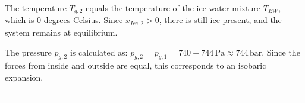 The temperature \( T_{g,2} \) equals the temperature of the ice-water mixture \( T_{EW} \), which is 0 degrees Celsius. Since \( x_{Ice,2} > 0 \), there is still ice present, and the system remains at equilibrium.  

The pressure \( p_{g,2} \) is calculated as:  
\( p_{g,2} = p_{g,1} = 740 - 744 \, \text{Pa} \approx 744 \, \text{bar} \).  
Since the forces from inside and outside are equal, this corresponds to an isobaric expansion.  

---